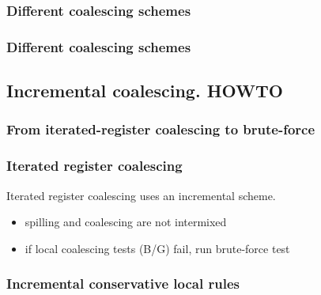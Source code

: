 \subsubsection*{Different coalescing schemes}
\begin{frame}[label=past]
\frametitle{Different coalescing schemes}
\vfill
 \centering{
   
 }
\end{frame}


\subsection*{Incremental coalescing. HOWTO}

\subsubsection*{From iterated-register coalescing to {\sf brute-force}}
\begin{frame}[label=past]
\frametitle{Iterated register coalescing}
\begin{block}{}
Iterated register coalescing uses an incremental scheme.
\end{block}

%
%
%
%
%
\begin{itemize}
  \item<2->[\txtimpl] spilling and coalescing are not intermixed
  \item<5->[\txtimpl] if local coalescing tests (B/G) fail, run
  \textsf{brute-force} test
\end{itemize}
\end{frame}

\begin{frame}[label=rules]
  \frametitle{Incremental conservative local rules}
  
\end{frame}


